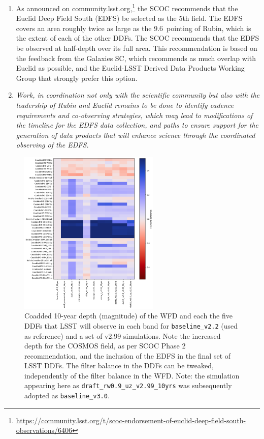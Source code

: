 \begin{enumerate}
\item As announced on community.lsst.org,\footnote{\url{https://community.lsst.org/t/scoc-endorsement-of-euclid-deep-field-south-observations/6406}} the SCOC recommends that the Euclid Deep Field South (EDFS) be selected as the 5th field. The EDFS covers an area roughly twice as large as the 9.6\degsq\ pointing of Rubin, which is the extent of each of the other DDFs. The SCOC recommends that the EDFS be observed at half-depth over its full area.
This recommendation is based on the feedback from the Galaxies SC, which recommends as much overlap with Euclid as possible, and the Euclid-LSST Derived Data Products Working Group \citep{https://doi.org/10.5281/zenodo.7195671} that strongly prefer this option. 

\item
 \emph{Work, in coordination not only with the scientific community but also with the leadership of Rubin and Euclid remains to be done to identify cadence requirements and co-observing strategies, which may lead to modifications of the timeline for the EDFS data collection, and paths to ensure support for the generation of data products that will enhance science through the coordinated observing of the EDFS.}


\end{enumerate}

\begin{figure}
    \centering
    \includegraphics[width=0.6\textwidth]{figures/ddf.png}
    \caption{Coadded 10-year depth (magnitude) of the WFD and each the five DDFs that LSST will observe in each band for \texttt{baseline\_v2.2} (used as reference) and a set of v2.99 simulations. Note the increased depth for the COSMOS field, as per SCOC Phase 2 recommendation, and the inclusion of the EDFS in the final set of LSST DDFs. The filter balance in the DDFs can be tweaked, independently of the filter balance in the WFD. Note: the simulation appearing here as \texttt{draft\_rw0.9\_uz\_v2.99\_10yrs} was subsequently adopted as \texttt{baseline\_v3.0}.}
    \label{fig:my_label}
\end{figure}
